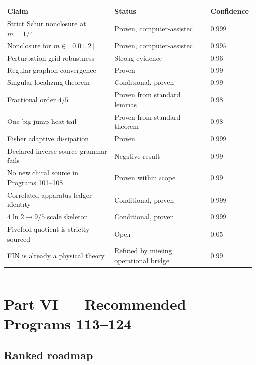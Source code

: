 \documentclass[11pt,a4paper,openany]{report}
\begin{document}
\begin{center}
\begingroup\small
\setlength{\tabcolsep}{3.5pt}
\renewcommand{\arraystretch}{1.16}
\begin{longtable}{@{}p{}p{}p{}@{}}
\toprule
\textbf{Claim} & \textbf{Status} & \textbf{Confidence} \\
\midrule
\endhead
Strict Schur nonclosure at \(m=1/4\) & Proven, computer-assisted & 0.999 \\
Nonclosure for \(m\in[0.01,2]\) & Proven, computer-assisted & 0.995 \\
Perturbation-grid robustness & Strong evidence & 0.96 \\
Regular graphon convergence & Proven & 0.99 \\
Singular localizing theorem & Conditional, proven & 0.99 \\
Fractional order \(4/5\) & Proven from standard lemmas & 0.98 \\
One-big-jump heat tail & Proven from standard theorem & 0.98 \\
Fisher adaptive dissipation & Proven & 0.999 \\
Declared inverse-source grammar fails & Negative result & 0.99 \\
No new chiral source in Programs 101--108 & Proven within scope & 0.99 \\
Correlated apparatus ledger identity & Conditional, proven & 0.999 \\
\(4\ln2\to9/5\) scale skeleton & Conditional, proven & 0.999 \\
Fivefold quotient is strictly sourced & Open & 0.05 \\
FIN is already a physical theory & Refuted by missing operational bridge & 0.99 \\
\bottomrule
\end{longtable}
\endgroup
\end{center}

\par\medskip\hrule\medskip

\chapter{Part VI --- Recommended Programs 113--124}

\section{Ranked roadmap}
\end{document}
